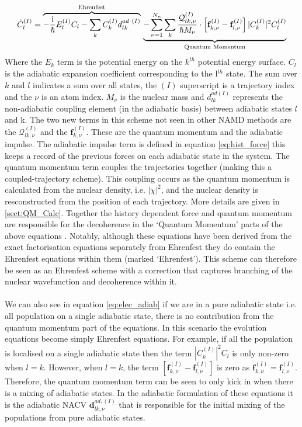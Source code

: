\begin{dmath}
  \dot{C}_{l}^{(I)} =
  \overbrace{
    -\frac{\im}{\hbar} E_l^{(I)} C_{l}
    - \sum_k C_k^{(I)} d_{lk}^{ad \ (I)}
  }^{\text{Ehrenfest}}
  \\
  \underbrace{
    - \sum_{\nu=1}^{N_n}\sum_{k} \frac{\mathcal{Q}_{lk, \nu}^{(I)}}{\hbar M_\nu} \cdot \left[ \mathbf{f}_{k,\nu}^{(I)} - \mathbf{f}_{l,\nu}^{(I)} \right] |C_{k}^{(I)}|^2 C_{l}^{(I)}
  }_{\text{Quantum Momentum}}
  \label{eq:elec_adiab}
\end{dmath}
Where the $E_k$ term is the potential energy on the $k^{th}$ potential energy surface. $C_l$ is the adiabatic expansion coefficient corresponding to the l$^{th}$ state. The sum over  $k$ and  $l$ indicates a sum over all states, the $(I)$ superscript is a trajectory index and the $\nu$ is an atom index. $M_{\nu}$ is  the nuclear mass and $d_{lk}^{ad (I)}$ represents the non-adiabatic coupling element (in the adiabatic basis) between adiabatic states  $l$ and k.
The two new terms in this scheme not seen in other NAMD methods are the $\mathcal{Q}_{lk, \nu}^{(I)}$ and the $\mathbf{f}_{k, \nu}^{(I)}$. These are the quantum momentum and the adiabatic impulse. The adiabatic impulse term is defined in equation \eqref{eq:hist_force} this keeps a record of the previous forces on each adiabatic state in the system. The quantum momentum term couples the trajectories together (making this a coupled-trajectory scheme). This coupling occurs as the quantum momentum is calculated from the nuclear density, i.e. $|\chi|^2$, and the nuclear density is resconstructed from the position of each trajectory. More details are given in \ref{sect:QM_Calc}. Together the history dependent force and quantum momentum are responsible for the decoherence in the `Quantum Momentum' parts of the above equations \cite{gossel_coupled-trajectory_2018}. Notably, although these equations have been derived from the exact factorisation equations separately from Ehrenfest they do contain the Ehrenfest equations within them (marked `Ehrenfest'). This scheme can therefore be seen as an Ehrenfest scheme with a correction that captures branching of the nuclear wavefunction and decoherence within it.
\\\\
We can also see in equation \eqref{eq:elec_adiab} if we are in a pure adiabatic state i.e. all population on a single adiabatic state, there is no contribution from the quantum momentum part of the equations. In this scenario the evolution equations become simply Ehrenfest equations. For example, if all the population is localised on a single adiabatic state then the term $|C_{k}^{(I)}|^2 C_{l}$ is only non-zero when $l = k$. However, when $l = k$, the term $\left[ \mathbf{f}_{k,\nu}^{(I)} - \mathbf{f}_{l,\nu}^{(I)} \right]$ is zero as $\mathbf{f}_{k,\nu}^{(I)} = \mathbf{f}_{l,\nu}^{(I)}$.
Therefore, the quantum momentum term can be seen to only kick in when there is a mixing of adiabatic states. In the adiabatic formulation of these equations it is the adiabatic NACV $\mathbf{d}_{lk, \nu}^{ad, (I)}$ that is responsible for the initial mixing of the populations from pure adiabatic states.

